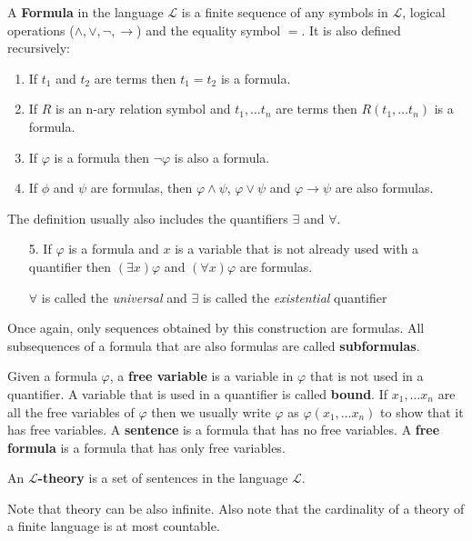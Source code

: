 \begin{defn} A \textbf{Formula} in the language $\mathcal{L}$ is a finite sequence of any symbols in $\mathcal{L}$, logical operations ($\wedge, \vee, \neg, \rightarrow$) and the equality symbol $=$. It is also defined recursively:
	\begin{enumerate}
		\item If $t_1$ and $t_2$ are terms then $t_1=t_2$ is a formula.
		\item If $R$ is an n-ary relation symbol and $t_1, \dots t_n$ are terms then $R(t_1, \dots t_n)$ is a formula. 
		\item If $\varphi$ is a formula then $\neg\varphi$ is also a formula.
		\item If $\phi$ and $\psi$ are formulas, then $\varphi\wedge\psi$, $\varphi\vee\psi$ and $\varphi\rightarrow\psi$ are also formulas.
	\end{enumerate}
	The definition usually also includes the quantifiers $\exists$ and $\forall$. 
	\begin{enumerate}
		\item[5.] If $\varphi$ is a formula and $x$ is a variable that is not already used with a quantifier then $(\exists x)\varphi$ and $(\forall x)\varphi$ are formulas.
		
		$\forall$ is called the \textit{universal} and $\exists$ is called the \textit{existential} quantifier
	\end{enumerate}
Once again, only sequences obtained by this construction are formulas. All subsequences of a formula that are also formulas are called \textbf{subformulas}.
\end{defn}

\begin{defn} Given a formula $\varphi$, a \textbf{free variable} is a variable in $\varphi$ that is not used in a quantifier. A variable that is used in a quantifier is called \textbf{bound}. If $x_1,\dots x_n$ are all the free variables of $\varphi$ then we usually write $\varphi$ as $\varphi(x_1,\dots x_n)$ to show that it has free variables.  A \textbf{sentence} is a formula that has no free variables. A \textbf{free formula} is a formula that has only free variables.
\end{defn}

\begin{defn}An \textbf{$\mathcal{L}$-theory} is a set of sentences in the language $\mathcal{L}$.
\end{defn}

Note that theory can be also infinite. Also note that the cardinality of a theory of a finite language is at most countable.

